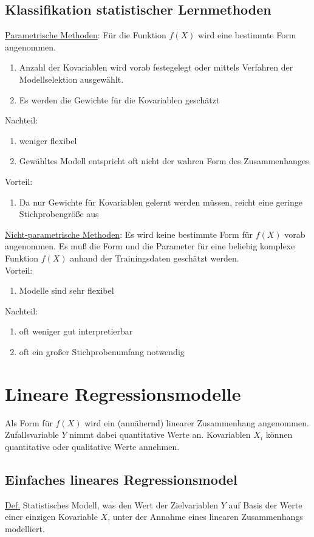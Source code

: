 \documentclass[10pt]{report}
\theoremstyle{definition}
\begin{document}
\subsection{Klassifikation statistischer Lernmethoden}
\underline{Parametrische Methoden}: Für die Funktion $f(X)$ wird eine bestimmte Form angenommen.
\begin{enumerate}
	\item Anzahl der Kovariablen wird vorab festegelegt oder mittels Verfahren der Modellselektion ausgewählt.
	\item Es werden die Gewichte für die Kovariablen geschätzt
\end{enumerate}
Nachteil: 
\begin{enumerate}
	\item weniger flexibel
	\item Gewähltes Modell entspricht oft nicht der wahren Form des Zusammenhanges
\end{enumerate}
Vorteil:
\begin{enumerate}
	\item Da nur Gewichte für Kovariablen gelernt werden müssen, reicht eine geringe Stichprobengröße aus
\end{enumerate}

\underline{Nicht-parametrische Methoden}: Es wird keine bestimmte Form für $f(X)$ vorab angenommen.
Es muß die Form und die Parameter für eine beliebig komplexe Funktion $f(X)$ anhand der Trainingsdaten geschätzt werden. \\
Vorteil:
\begin{enumerate}
	\item Modelle sind sehr flexibel
\end{enumerate}

Nachteil:
\begin{enumerate}
	\item oft weniger gut interpretierbar
	\item oft ein großer Stichprobenumfang notwendig
\end{enumerate}

\section{Lineare Regressionsmodelle}
Als Form für $f(X)$ wird ein (annähernd) linearer Zusammenhang angenommen. Zufallsvariable $Y$ nimmt dabei quantitative Werte an. 
Kovariablen $X_i$ können quantitative oder qualitative Werte annehmen.

\subsection{Einfaches lineares Regressionsmodel}
\underline{Def.} Statistisches Modell, was den Wert der Zielvariablen $Y$ auf Basis der Werte einer einzigen Kovariable $X$, unter der Annahme eines linearen Zusammenhangs modelliert.
\end{document}

